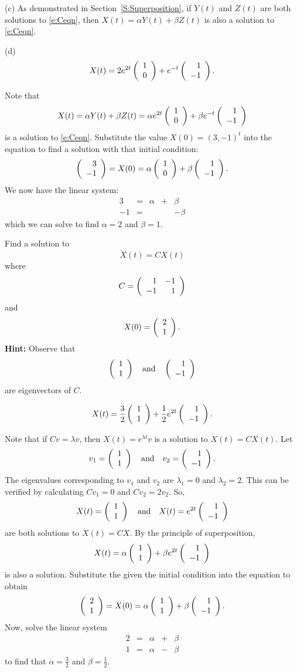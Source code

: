 \documentclass{ximera}
\begin{document}
\begin{exercise}
\begin{solution}
(c) As demonstrated in Section~\ref{S:Superposition}, if
$Y(t)$ and $Z(t)$ are both solutions to
\eqref{e:Ceqn}, then $X(t) = \alpha Y(t) + \beta Z(t)$ is also
a solution to \eqref{e:Ceqn}.

(d) \ans 
\[
X(t) = 2e^{2t}\left(\begin{array}{r} 1 \\ 0\end{array}\right) + e^{-t}\left(\begin{array}{r} 1 \\ -1\end{array}\right).
\]

\soln Note that
\[ X(t) = \alpha Y(t) + \beta Z(t) = \alpha e^{2t}\left(\begin{array}{r} 1 \\ 0\end{array}\right)
+ \beta e^{-t}\left(\begin{array}{r} 1 \\ -1\end{array}\right) \]
is a solution to \eqref{e:Ceqn}.  Substitute the value
$X(0) = (3,-1)^t$  into the equation to find a solution with that
initial condition:
\[
\left(\begin{array}{r} 3 \\ -1\end{array}\right) = X(0) = \alpha\left(\begin{array}{r} 1 \\ 0\end{array}\right) +
\beta\left(\begin{array}{r} 1 \\ -1\end{array}\right).
\]
We now have the linear system:
\[ \begin{array}{rrrrr}
3 & = & \alpha & + & \beta \\
-1 & = & & & -\beta \end{array} \]
which we can solve to find $\alpha = 2$ and $\beta = 1$.


\end{solution}
\end{exercise}

\begin{exercise} \label{c4.5.2}
Find a solution to
\[
\dot{X}(t)=CX(t)
\]
where
\[
C=\left(\begin{array}{rr} 1 & -1\\ -1 &1\end{array}\right)
\]
and
\[
X(0)=\left(\begin{array}{r} 2 \\ 1\end{array}\right).
\]
{\bf Hint:} Observe that
\[
\left(\begin{array}{r} 1 \\ 1\end{array}\right) \quad\mbox{and}\quad \left(\begin{array}{r} 1 \\ -1\end{array}\right)
\]
are eigenvectors of $C$.

\begin{solution}

\ans 
\[
X(t) = \frac{3}{2}\left(\begin{array}{r} 1 \\ 1\end{array}\right) + \frac{1}{2}e^{2t}\left(\begin{array}{r} 1 \\ -1\end{array}\right).
\]

\soln Note that if $Cv = \lambda v$, then $X(t) = e^{\lambda t}v$ is a
solution to $\dot{X}(t) = CX(t)$.  Let
\[
v_1 = \left(\begin{array}{r} 1 \\ 1\end{array}\right) \quad\mbox{and}\quad v_2 = \left(\begin{array}{r} 1 \\ -1\end{array}\right).
\]
The eigenvalues corresponding to $v_1$ and $v_2$ are
$\lambda_1 = 0$ and $\lambda_2 = 2$.  This can be verified
by calculating $Cv_1 = 0$ and $Cv_2 = 2v_2$.
So,
\[
X(t) = \left(\begin{array}{r} 1 \\ 1\end{array}\right) \quad\mbox{and}\quad X(t) = e^{2t}\left(\begin{array}{r} 1 \\ -1\end{array}\right)
\]
are both solutions to $\dot{X}(t) = CX$.  By the principle of
superposition,
\[
X(t) = \alpha\left(\begin{array}{r} 1 \\ 1\end{array}\right) + \beta e^{2t}\left(\begin{array}{r} 1 \\ -1\end{array}\right)
\]
is also a solution.
Substitute the given the initial condition into the equation to obtain
\[
\left(\begin{array}{r} 2 \\ 1\end{array}\right) = X(0) = \alpha\left(\begin{array}{r} 1 \\ 1\end{array}\right) + \beta\left(\begin{array}{r} 1 \\ -1\end{array}\right).
\]
Now, solve the linear system
\[
\begin{array}{rrrrr}
2 & = & \alpha & + & \beta \\
1 & = & \alpha & - & \beta \end{array}
\]
to find that $\alpha = \frac{3}{2}$ and $\beta = \frac{1}{2}$.


\end{solution}
\end{exercise}
\end{document}
